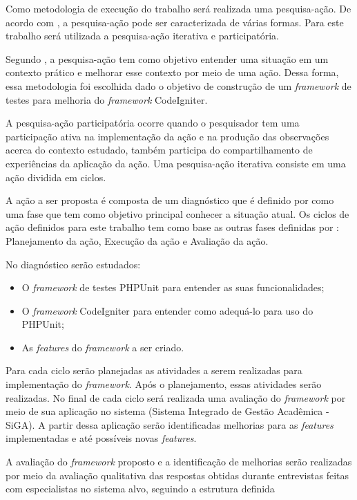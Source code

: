 Como metodologia de execução do trabalho será realizada uma pesquisa-ação. De acordo com , 
a pesquisa-ação pode ser caracterizada de várias formas. Para este trabalho será utilizada a pesquisa-ação iterativa e participatória.

Segundo , a pesquisa-ação tem como objetivo entender uma situação em um contexto prático e melhorar esse contexto por meio de uma ação.
Dessa forma, essa metodologia foi escolhida dado o objetivo de construção de um \textit{framework} de testes para melhoria do \textit{framework} CodeIgniter.

A pesquisa-ação participatória ocorre quando o pesquisador tem uma participação ativa na implementação da ação e na produção das observações acerca do contexto estudado, também participa do compartilhamento de experiências da aplicação da ação. Uma pesquisa-ação iterativa consiste em uma ação dividida em ciclos. \cite{artigo_pesquisa_acao}

A ação a ser proposta é composta de um diagnóstico que é definido por  como uma fase que tem como objetivo principal conhecer a situação atual. Os ciclos de ação definidos para este trabalho tem como base as outras fases definidas por : Planejamento da ação, Execução da ação e Avaliação da ação.

No diagnóstico serão estudados:
	\begin{itemize}
		\item O \textit{framework} de testes PHPUnit para entender as suas funcionalidades;
		\item O \textit{framework} CodeIgniter para entender como adequá-lo para uso do PHPUnit;
		\item As \textit{features} do \textit{framework} a ser criado.
	\end{itemize}

Para cada ciclo serão planejadas as atividades a serem realizadas para implementação do \textit{framework}.
Após o planejamento, essas atividades serão realizadas.
No final de cada ciclo será realizada uma avaliação do \textit{framework} por meio
de sua aplicação no sistema (Sistema Integrado de Gestão Acadêmica - SiGA). A partir dessa aplicação serão identificadas
melhorias para as \textit{features} implementadas e até possíveis novas \textit{features}. 

A avaliação do \textit{framework} proposto e a identificação de melhorias serão realizadas por meio da avaliação qualitativa 
das respostas obtidas durante entrevistas feitas com especialistas no sistema alvo, seguindo a estrutura definida 
